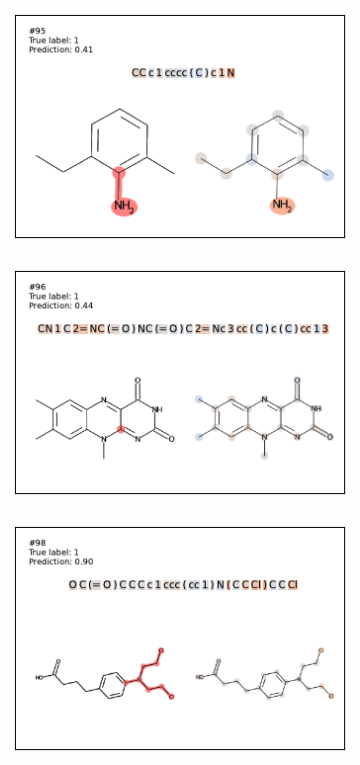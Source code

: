 \begin{figure}
\begin{subfigure}[b]{0.33\textwidth}
\end{subfigure}\begin{subfigure}[b]{0.33\textwidth} 
  \centering 
  \includegraphics[width=\textwidth]{figures/ames/ames95.pdf} 
\end{subfigure} 
\begin{subfigure}[b]{0.33\textwidth} 
  \centering 
  \includegraphics[width=\textwidth]{figures/ames/ames96.pdf} 
\end{subfigure}\begin{subfigure}[b]{0.33\textwidth} 
  \centering 
  \includegraphics[width=\textwidth]{figures/ames/ames98.pdf} 

\end{subfigure}
\end{figure}
